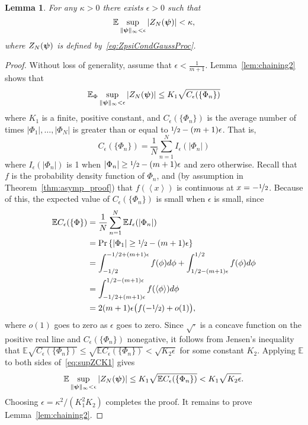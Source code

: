 \documentclass[aap]{imsart}
\newcommand{\prob}{\operatorname{Pr}}
\newcommand{\expect}{{\mathbb E}}
\newcommand{\fracpart}[1]{\left\langle #1 \right\rangle}
\newcommand{\abs}[1]{\left\vert #1 \right\vert}
\newtheorem{lemma}{Lemma}
\newcommand{\cubr}[1]{{\left\{ #1 \right\}}}
\begin{document}
\begin{lemma} \label{lem:chaining}
For any $\kappa > 0$ there exists $\epsilon > 0$ such that
\[
\expect \sup_{\|\psibf\|_{\infty} < \epsilon} \abs{ Z_N(\psibf) } < \kappa,
\]
where $Z_N(\boldsymbol{\psi})$ is defined by~\eqref{eq:ZpsiCondGaussProc}.
\end{lemma}
\begin{proof}
Without loss of generality, assume that $\epsilon < \frac{1}{m+1}$.  Lemma~\ref{lem:chaining2} shows that
\begin{equation}\label{eq:supZCK1} 
\expect_\Phi \sup_{\|\psibf\|_{\infty} < \epsilon} \abs{ Z_N(\psibf) } \leq K_1 \sqrt{C_\epsilon(\{\Phi_n\})}
\end{equation}
where $K_1$ is a finite, positive constant, and $C_\epsilon(\{\Phi_n\})$ is the average number of times $\abs{\Phi_1}, \dots, \abs{\Phi_N}$ is greater than or equal to $\nicefrac{1}{2} - (m+1)\epsilon$.  That is,
\begin{equation}\label{eq:Cedefn}
C_\epsilon(\{\Phi_n\}) = \frac{1}{N} \sum_{n=1}^{N} I_\epsilon(\abs{\Phi_n})
\end{equation}
where $I_\epsilon(\abs{\Phi_n})$ is 1 when $\abs{\Phi_n} \geq \nicefrac{1}{2} - (m+1)\epsilon$ and zero otherwise.  Recall that $f$ is the probability density function of $\Phi_n$, and (by assumption in Theorem~\ref{thm:asymp_proof}) that $f(\fracpart{x})$ is continuous at $x = -\nicefrac{1}{2}$.  Because of this, the expected value of $C_\epsilon(\{\Phi_n\})$ is small when $\epsilon$ is small, since
\begin{align*}
\expect C_\epsilon(\{\Phi\}) &= \frac{1}{N} \sum_{n=1}^{N} \expect I_\epsilon(\abs{\Phi_n}) \\
&= \prob\cubr{\abs{\Phi_1} \geq \nicefrac{1}{2} - (m+1)\epsilon} \\
&= \int_{-1/2}^{-1/2 + (m+1)\epsilon} f(\phi) d\phi + \int_{1/2 - (m+1)\epsilon}^{1/2} f(\phi) d\phi \\
&= \int_{-1/2 + (m+1)\epsilon}^{1/2 - (m+1)\epsilon} f(\fracpart{\phi}) d\phi \\
&= 2(m+1)\epsilon \big(f(-\nicefrac{1}{2}) + o(1)\big),
\end{align*}
where $o(1)$ goes to zero as $\epsilon$ goes to zero.  Since $\sqrt{\cdot}$ is a concave function on the positive real line and $C_{\epsilon}(\{\Phi_n\})$ nonegative, it follows from Jensen's inequality that $\expect \sqrt{C_\epsilon(\{\Phi_n\})} \leq  \sqrt{\expect  C_\epsilon(\{\Phi_n\} )} < \sqrt{K_2 \epsilon }$ for some constant $K_2$.  Applying $\expect$ to both sides of~\eqref{eq:supZCK1} gives
\[
\expect \sup_{\|\psibf\|_{\infty} < \epsilon} \abs{ Z_N(\psibf) } \leq K_1 \sqrt{\expect C_\epsilon(\{\Phi_n\})} < K_1 \sqrt{K_2 \epsilon}.
\]
Choosing $\epsilon = \kappa^2/(K_1^2 K_2)$ completes the proof.  It remains to prove Lemma~\ref{lem:chaining2}.
\end{proof}
\end{document}
